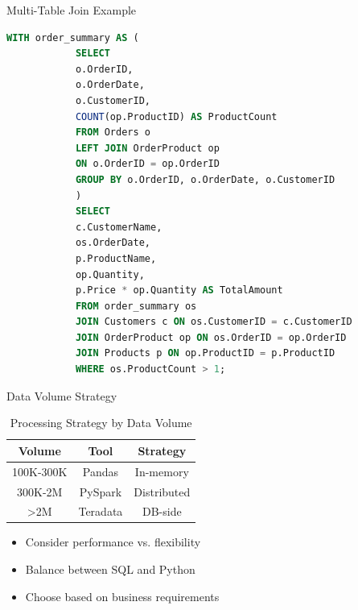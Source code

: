 \documentclass{beamer}
\begin{document}
	\begin{frame}[fragile]{Multi-Table Join Example}
		\begin{lstlisting}[language=SQL, caption=Complex Join with CTE]
			WITH order_summary AS (
			SELECT 
			o.OrderID,
			o.OrderDate,
			o.CustomerID,
			COUNT(op.ProductID) AS ProductCount
			FROM Orders o
			LEFT JOIN OrderProduct op 
			ON o.OrderID = op.OrderID
			GROUP BY o.OrderID, o.OrderDate, o.CustomerID
			)
			SELECT 
			c.CustomerName,
			os.OrderDate,
			p.ProductName,
			op.Quantity,
			p.Price * op.Quantity AS TotalAmount
			FROM order_summary os
			JOIN Customers c ON os.CustomerID = c.CustomerID
			JOIN OrderProduct op ON os.OrderID = op.OrderID
			JOIN Products p ON op.ProductID = p.ProductID
			WHERE os.ProductCount > 1;
		\end{lstlisting}
	\end{frame}
	
	\begin{frame}{Data Volume Strategy}
		\begin{table}
			\centering
			\begin{tabular}{|c|c|c|}
				\hline
				\textbf{Volume} & \textbf{Tool} & \textbf{Strategy} \\
				\hline
				100K-300K & Pandas & In-memory \\
				300K-2M & PySpark & Distributed \\
				>2M & Teradata & DB-side \\
				\hline
			\end{tabular}
			\caption{Processing Strategy by Data Volume}
		\end{table}
		\vspace{0.5cm}
		\begin{itemize}
			\item Consider performance vs. flexibility
			\item Balance between SQL and Python
			\item Choose based on business requirements
		\end{itemize}
	\end{frame}
	
\end{document}
